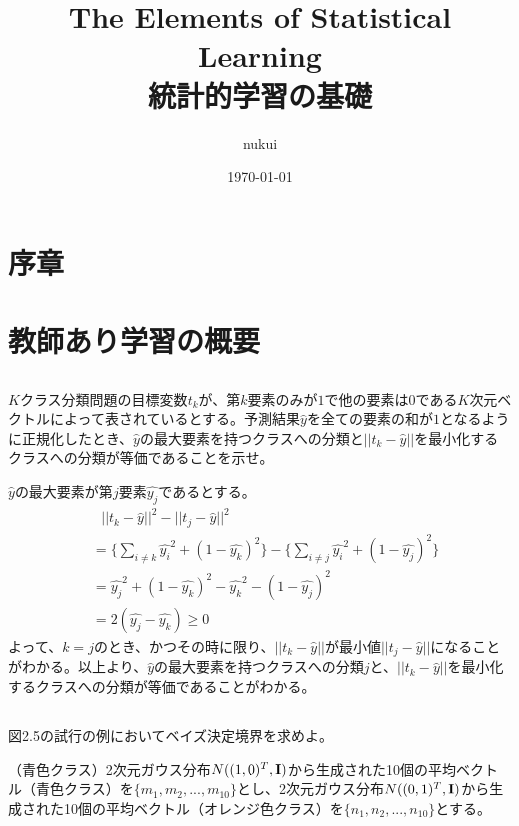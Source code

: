 \documentclass{jsarticle}
\begin{document}
\title{The Elements of Statistical Learning\\統計的学習の基礎}
\author{nukui}
\date{\today}
\maketitle



\section{序章}

\section{教師あり学習の概要}
\subsection{}
\begin{shadebox}
$K$クラス分類問題の目標変数$t_k$が、第$k$要素のみが$1$で他の要素は$0$である$K$次元ベクトルによって表されているとする。予測結果$\hat{y}$を全ての要素の和が$1$となるように正規化したとき、$\hat{y}$の最大要素を持つクラスへの分類と$||t_k-\hat{y}||$を最小化するクラスへの分類が等価であることを示せ。
\end{shadebox}
$\hat{y}$の最大要素が第$j$要素$\hat{y_j}$であるとする。
\begin{align*}
&\ \ \ ||t_k-\hat{y}||^2-||t_j-\hat{y}||^2\\
&=\{\sum_{i\neq k}\hat{y_i}^2+(1-\hat{y_k})^2\}-\{\sum_{i\neq j}\hat{y_i}^2+(1-\hat{y_j})^2\}\\
&=\hat{y_j}^2+(1-\hat{y_k})^2-\hat{y_k}^2-(1-\hat{y_j})^2\\
&=2(\hat{y_j}-\hat{y_k})\geq0
\end{align*}
よって、$k=j$のとき、かつその時に限り、$||t_k-\hat{y}||$が最小値$||t_j-\hat{y}||$になることがわかる。以上より、$\hat{y}$の最大要素を持つクラスへの分類$j$と、$||t_k-\hat{y}||$を最小化するクラスへの分類が等価であることがわかる。


\subsection{}
\begin{shadebox}
図2.5の試行の例においてベイズ決定境界を求めよ。
\end{shadebox}
（青色クラス）2次元ガウス分布$N((1,0)^T,\bf{I})$から生成された10個の平均ベクトル（青色クラス）を$\{m_1,m_2,...,m_{10}\}$とし、2次元ガウス分布$N((0,1)^T,\bf{I})$から生成された10個の平均ベクトル（オレンジ色クラス）を$\{n_1,n_2,...,n_{10}\}$とする。
\end{document}
